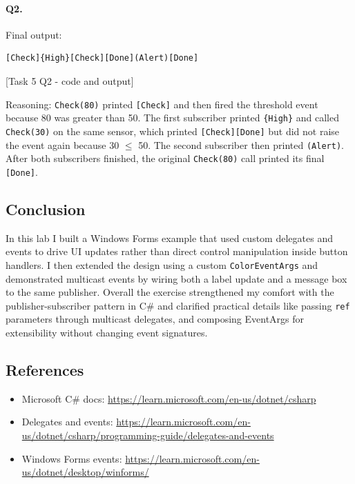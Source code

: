 \newpage

\paragraph{Q2.} Final output: 
\begin{lstlisting}
[Check]{High}[Check][Done](Alert)[Done]
\end{lstlisting}

[Task 5 Q2 - code and output]

Reasoning: \texttt{Check(80)} printed \texttt{[Check]} and then fired the threshold event because 80 was greater than 50. The first subscriber printed \texttt{\{High\}} and called \texttt{Check(30)} on the same sensor, which printed \texttt{[Check][Done]} but did not raise the event again because 30 $\leq$ 50. The second subscriber then printed \texttt{(Alert)}. After both subscribers finished, the original \texttt{Check(80)} call printed its final \texttt{[Done]}.

\subsection{Conclusion}
In this lab I built a Windows Forms example that used custom delegates and events to drive UI updates rather than direct control manipulation inside button handlers. I then extended the design using a custom \texttt{ColorEventArgs} and demonstrated multicast events by wiring both a label update and a message box to the same publisher. Overall the exercise strengthened my comfort with the publisher-subscriber pattern in C\# and clarified practical details like passing \texttt{ref} parameters through multicast delegates, and composing EventArgs for extensibility without changing event signatures.

\subsection{References}
\begin{itemize}[itemsep=0pt]
	\item Microsoft C\# docs: \url{https://learn.microsoft.com/en-us/dotnet/csharp}
	\item Delegates and events: \url{https://learn.microsoft.com/en-us/dotnet/csharp/programming-guide/delegates-and-events}
	\item Windows Forms events: \url{https://learn.microsoft.com/en-us/dotnet/desktop/winforms/}
\end{itemize}
